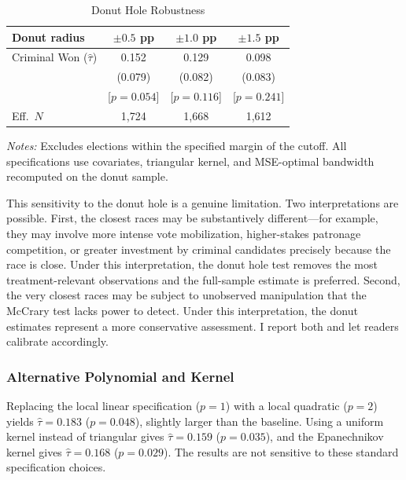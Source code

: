\documentclass[12pt]{article}
\begin{document}
\begin{table}[H]
\centering
\caption{Donut Hole Robustness}
\label{tab:donut}
\begin{threeparttable}
\begin{tabular}{lccc}
\toprule
Donut radius & $\pm 0.5$ pp & $\pm 1.0$ pp & $\pm 1.5$ pp \\
\midrule
Criminal Won ($\hat{\tau}$) & 0.152 & 0.129 & 0.098 \\
 & (0.079) & (0.082) & (0.083) \\
 & [$p=0.054$] & [$p=0.116$] & [$p=0.241$] \\[3pt]
Eff.\ $N$ & 1,724 & 1,668 & 1,612 \\
\bottomrule
\end{tabular}
\begin{tablenotes}[flushleft]
\small
\item \textit{Notes:} Excludes elections within the specified margin of the cutoff. All specifications use covariates, triangular kernel, and MSE-optimal bandwidth recomputed on the donut sample.
\end{tablenotes}
\end{threeparttable}
\end{table}

This sensitivity to the donut hole is a genuine limitation. Two interpretations are possible. First, the closest races may be substantively different---for example, they may involve more intense vote mobilization, higher-stakes patronage competition, or greater investment by criminal candidates precisely because the race is close. Under this interpretation, the donut hole test removes the most treatment-relevant observations and the full-sample estimate is preferred. Second, the very closest races may be subject to unobserved manipulation that the McCrary test lacks power to detect. Under this interpretation, the donut estimates represent a more conservative assessment. I report both and let readers calibrate accordingly.

\subsubsection{Alternative Polynomial and Kernel}

Replacing the local linear specification ($p=1$) with a local quadratic ($p=2$) yields $\hat{\tau} = 0.183$ ($p = 0.048$), slightly larger than the baseline. Using a uniform kernel instead of triangular gives $\hat{\tau} = 0.159$ ($p = 0.035$), and the Epanechnikov kernel gives $\hat{\tau} = 0.168$ ($p = 0.029$). The results are not sensitive to these standard specification choices.
\end{document}
